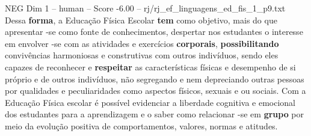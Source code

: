 \begin{textsample}{NEG Dim 1 – human – Score -6.00 – rj/rj\_ef\_linguagens\_ed\_fis\_1\_p9.txt}  \label{ex:f1_neg_010}
Dessa \textbf{forma}, a Educação Física Escolar \textbf{tem} como objetivo, mais do que apresentar -se como fonte de conhecimentos, despertar nos estudantes o interesse em envolver -se com as atividades e exercícios \textbf{corporais}, \textbf{possibilitando} convivências harmoniosas e construtivas com outros indivíduos, sendo eles capazes de reconhecer e \textbf{respeitar} as características físicas e desempenho de si próprio e de outros indivíduos, não segregando e nem depreciando outras pessoas por qualidades e peculiaridades como aspectos físicos, sexuais e ou sociais.
Com a Educação Física escolar é possível evidenciar a liberdade cognitiva e emocional dos estudantes para a aprendizagem e o saber como relacionar -se em \textbf{grupo} por meio da evolução positiva de comportamentos, valores, normas e atitudes.

\end{textsample}
